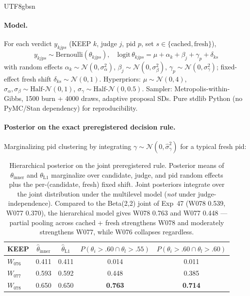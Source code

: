 \documentclass{article}
\begin{document}
\begin{CJK*}{UTF8}{gbsn}
\paragraph{Model.} For each verdict \(y_{kjp s}\) (KEEP \(k\),
judge \(j\), pid \(p\), set \(s \in \{\mathrm{cached},
\mathrm{fresh}\}\)),
\[
y_{kjps} \sim \mathrm{Bernoulli}(\theta_{kjps}), \quad
\mathrm{logit}\,\theta_{kjps} = \mu + \alpha_k + \beta_j +
\gamma_p + \delta_{ks}
\]
with random effects
\(\alpha_k \sim \mathcal{N}(0, \sigma_\alpha^2)\),
\(\beta_j \sim \mathcal{N}(0, \sigma_\beta^2)\),
\(\gamma_p \sim \mathcal{N}(0, \sigma_\gamma^2)\); fixed-effect
fresh shift \(\delta_{ks} \sim \mathcal{N}(0, 1)\). Hyperpriors:
\(\mu \sim \mathcal{N}(0, 4)\), \(\sigma_\alpha, \sigma_\beta \sim
\text{Half-}\mathcal{N}(0, 1)\), \(\sigma_\gamma \sim
\text{Half-}\mathcal{N}(0, 0.5)\). Sampler: Metropolis-within-
Gibbs, 1500 burn + 4000 draws, adaptive proposal SDs. Pure stdlib
Python (no PyMC/Stan dependency) for reproducibility.

\paragraph{Posterior on the exact preregistered decision rule.}
Marginalizing pid clustering by integrating
\(\gamma \sim \mathcal{N}(0, \hat\sigma_\gamma^2)\) for a typical
fresh pid:

\begin{table}[h]
  \centering\small
  \begin{tabular}{l c c c c}
    \toprule
    KEEP & \(\hat\theta_{\mathrm{inner}}\) & \(\hat\theta_{\mathrm{L1}}\) & \(P(\theta_i > .60 \cap \theta_l > .55)\) & \(P(\theta_i > .60 \cap \theta_l > .60)\) \\
    \midrule
    \(W_{076}\) & 0.411 & 0.411 & 0.014          & 0.011 \\
    \(W_{077}\) & 0.593 & 0.592 & 0.448          & 0.385 \\
    \(W_{078}\) & 0.650 & 0.650 & \textbf{0.763} & \textbf{0.714} \\
    \bottomrule
  \end{tabular}
  \caption{Hierarchical posterior on the joint preregistered rule.
    Posterior means of \(\theta_{\mathrm{inner}}\) and
    \(\theta_{\mathrm{L1}}\) marginalize over candidate, judge,
    and pid random effects plus the per-(candidate, fresh) fixed
    shift. Joint posteriors integrate over the joint distribution
    under the multilevel model (\emph{not} under judge-independence).
    Compared to the Beta(2,2) joint of Exp~47 (W078 0.539, W077
    0.370), the hierarchical model gives W078 0.763 and W077 0.448
    — partial pooling across cached + fresh strengthens W078 and
    moderately strengthens W077, while W076 collapses regardless.}
  \label{tab:exp51-bayes}
\end{table}


\end{CJK*}
\end{document}
